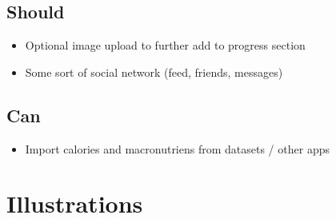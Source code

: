\documentclass{article}
\begin{document}
      \subsection{Should}
        \begin{itemize}
          \item Optional image upload to further add to progress section
          \item Some sort of social network (feed, friends, messages)
        \end{itemize}

      \subsection{Can}
        \begin{itemize}
          \item Import calories and macronutriens from datasets / other apps
        \end{itemize}

  \newpage
  \section{Illustrations}
      
\end{document}
